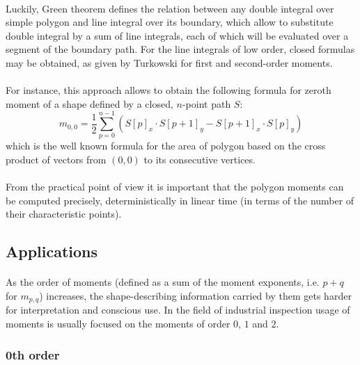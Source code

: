\paragraph*{}
Luckily, Green theorem defines the relation between any double integral over simple polygon and line integral over its boundary, which allow to substitute double integral by a sum of line integrals, each of which will be evaluated over a segment of the boundary path. For the line integrals of low order, closed formulas may be obtained, as given\cite{Turkowski97} by Turkowski for first and second-order moments.

\paragraph*{}
For instance, this approach allows to obtain the following formula for zeroth moment of a shape defined by a closed, $n$-point path $S$:
\[
	m_{0,0} = \frac{1}{2} \sum_{p = 0}^{n-1} (S[p]_x \cdot S[p+1]_y  - S[p+1]_x \cdot S[p]_y)
\]
which is the well known formula for the area of polygon based on the cross product of vectors from $(0,0)$ to its consecutive vertices. 

\paragraph*{}
From the practical point of view it is important that the polygon moments can be computed precisely, deterministically in linear time (in terms of the number of their characteristic points).

\subsection{Applications}

\paragraph*{}
As the order of moments (defined as a sum of the moment exponents, i.e. $p+q$ for $m_{p,q}$) increases, the shape-describing information carried by them gets harder for interpretation and conscious use. In the field of industrial inspection usage of moments is usually focused on the moments of order $0$, $1$ and $2$.

\subsubsection{0th order}


